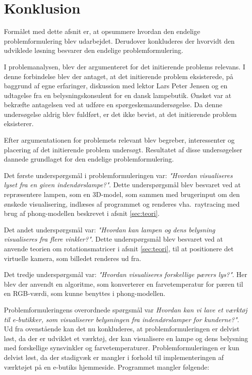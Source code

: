\section{Konklusion}
Formålet med dette afsnit er, at opsummere hvordan den endelige problemformulering blev udarbejdet. Derudover konkluderes der hvorvidt den udviklede løsning besvarer den endelige problemformulering.

I problemanalysen, blev der argumenteret for det initierende problems relevans. I denne forbindelse blev der antaget, at det initierende problem eksisterede, på baggrund af egne erfaringer, diskussion med lektor Lars Peter Jensen og en udtagelse fra en belysningskonsulent for en dansk lampebutik. Ønsket var at bekræfte antagelsen ved at udføre en spørgeskemaundersøgelse. Da denne undersøgelse aldrig blev fuldført, er det ikke bevist, at det initierende problem eksisterer.

Efter argumentationen for problemets relevant blev begreber, interessenter og placering af det initierende problem undersøgt. Resultatet af disse undersøgelser dannede grundlaget for den endelige problemformulering.

Det første underspørgsmål i problemformuleringen var: \textit{"Hvordan visualiseres lyset fra en given indendørslampe?"}. Dette underspørgsmål blev besvaret ved at repræsentere lampen, som en 3D-model, som sammen med brugerinput om den ønskede visualisering, indlæses af programmet og renderes vha.\ raytracing med brug af phong-modellen beskrevet i afsnit \ref{sec:teori}.

Det andet underspørgsmål var: \textit{"Hvordan kan lampen og dens belysning visualiseres fra flere vinkler?"}. Dette underspørgsmål blev besvaret ved at anvende teorien om rotationsmatricer i afsnit \ref{sec:teori}, til at positionere det virtuelle kamera, som billedet renderes ud fra.

Det tredje underspørgsmål var: \textit{"Hvordan visualiseres forskellige pærers lys?"}. Her blev der anvendt en algoritme, som konverterer en farvetemperatur for pæren til en RGB-værdi, som kunne benyttes i phong-modellen.

Problemformuleringens overordnede spørgsmål var \textit{Hvordan kan vi lave et værktøj til e-butikker, som visualiserer belysningen fra indendørslamper for kunderne?"}. Ud fra ovenstående kan det nu konkluderes, at problemformuleringen er delvist løst, da der er udviklet et værktøj, der kan visualisere en lampe og dens belysning med forskellige synsvinkler og farvetemperaturer. Problemformuleringen er kun delvist løst, da der stadigvæk er mangler i forhold til implementeringen af værktøjet på en e-butiks hjemmeside. Programmet mangler følgende:

